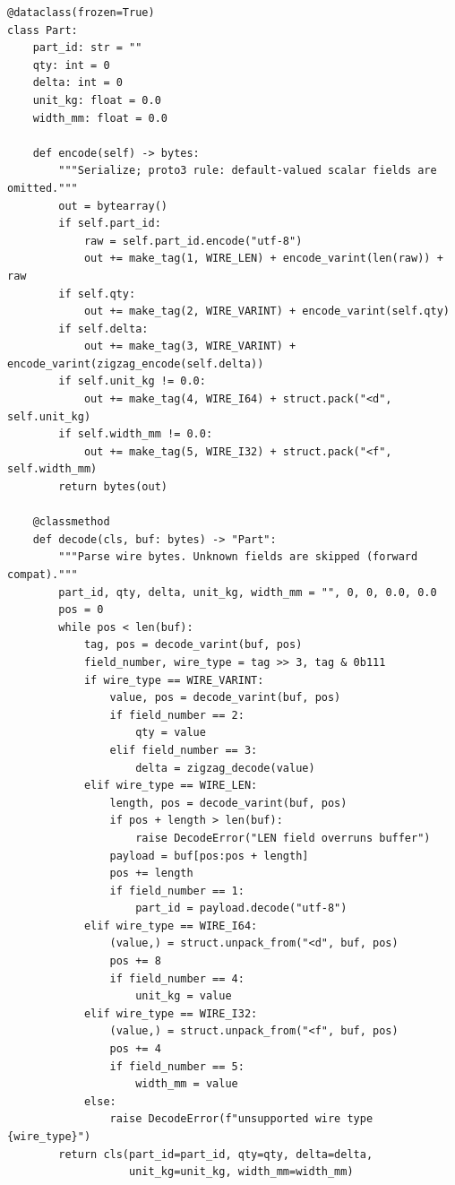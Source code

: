\begin{verbatim}
@dataclass(frozen=True)
class Part:
    part_id: str = ""
    qty: int = 0
    delta: int = 0
    unit_kg: float = 0.0
    width_mm: float = 0.0

    def encode(self) -> bytes:
        """Serialize; proto3 rule: default-valued scalar fields are omitted."""
        out = bytearray()
        if self.part_id:
            raw = self.part_id.encode("utf-8")
            out += make_tag(1, WIRE_LEN) + encode_varint(len(raw)) + raw
        if self.qty:
            out += make_tag(2, WIRE_VARINT) + encode_varint(self.qty)
        if self.delta:
            out += make_tag(3, WIRE_VARINT) + encode_varint(zigzag_encode(self.delta))
        if self.unit_kg != 0.0:
            out += make_tag(4, WIRE_I64) + struct.pack("<d", self.unit_kg)
        if self.width_mm != 0.0:
            out += make_tag(5, WIRE_I32) + struct.pack("<f", self.width_mm)
        return bytes(out)

    @classmethod
    def decode(cls, buf: bytes) -> "Part":
        """Parse wire bytes. Unknown fields are skipped (forward compat)."""
        part_id, qty, delta, unit_kg, width_mm = "", 0, 0, 0.0, 0.0
        pos = 0
        while pos < len(buf):
            tag, pos = decode_varint(buf, pos)
            field_number, wire_type = tag >> 3, tag & 0b111
            if wire_type == WIRE_VARINT:
                value, pos = decode_varint(buf, pos)
                if field_number == 2:
                    qty = value
                elif field_number == 3:
                    delta = zigzag_decode(value)
            elif wire_type == WIRE_LEN:
                length, pos = decode_varint(buf, pos)
                if pos + length > len(buf):
                    raise DecodeError("LEN field overruns buffer")
                payload = buf[pos:pos + length]
                pos += length
                if field_number == 1:
                    part_id = payload.decode("utf-8")
            elif wire_type == WIRE_I64:
                (value,) = struct.unpack_from("<d", buf, pos)
                pos += 8
                if field_number == 4:
                    unit_kg = value
            elif wire_type == WIRE_I32:
                (value,) = struct.unpack_from("<f", buf, pos)
                pos += 4
                if field_number == 5:
                    width_mm = value
            else:
                raise DecodeError(f"unsupported wire type {wire_type}")
        return cls(part_id=part_id, qty=qty, delta=delta,
                   unit_kg=unit_kg, width_mm=width_mm)



\end{verbatim}
